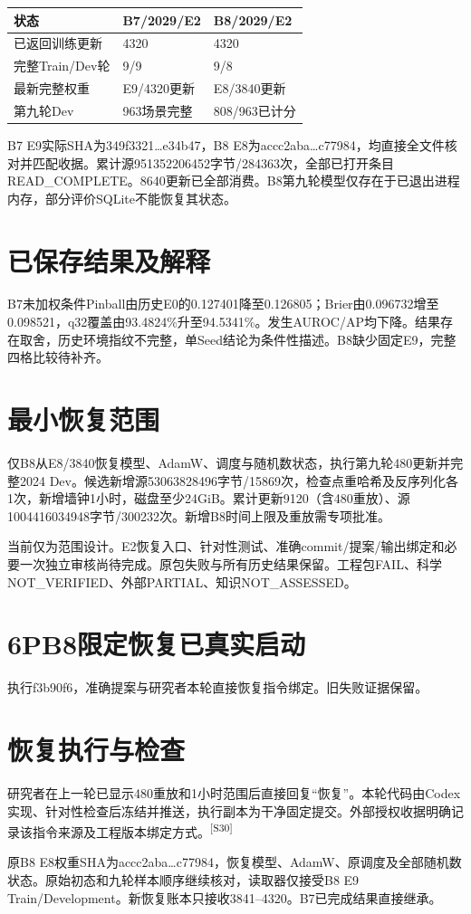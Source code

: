 \documentclass[UTF8,10.5pt,a4paper,fontset=none]{ctexart}
\newcommand{\evi}[1]{\textsuperscript{\color{muted}[#1]}}
\newcommand{\pageheading}[2]{\clearpage\section*{#1}\textcolor{muted}{#2}\par\vspace{3pt}}
\begin{document}
\begin{tabularx}{\textwidth}{@{}p{3.1cm}X X@{}}
\toprule 状态 & B7/2029/E2 & B8/2029/E2\\\midrule
已返回训练更新 & 4320 & 4320\\
完整Train/Dev轮 & 9/9 & 9/8\\
最新完整权重 & E9/4320更新 & E8/3840更新\\
第九轮Dev & 963场景完整 & 808/963已计分\\
\bottomrule
\end{tabularx}

B7 E9实际SHA为349f3321\ldots e34b47，B8 E8为accc2aba\ldots c77984，均直接全文件核对并匹配收据。累计源951352206452字节/284363次，全部已打开条目READ\_COMPLETE。8640更新已全部消费。B8第九轮模型仅存在于已退出进程内存，部分评价SQLite不能恢复其状态。

\section*{已保存结果及解释}
B7未加权条件Pinball由历史E0的0.127401降至0.126805；Brier由0.096732增至0.098521，q32覆盖由93.4824\%升至94.5341\%。发生AUROC/AP均下降。结果存在取舍，历史环境指纹不完整，单Seed结论为条件性描述。B8缺少固定E9，完整四格比较待补齐。

\section*{最小恢复范围}
仅B8从E8/3840恢复模型、AdamW、调度与随机数状态，执行第九轮480更新并完整2024 Dev。候选新增源53063828496字节/15869次，检查点重哈希及反序列化各1次，新增墙钟1小时，磁盘至少24GiB。累计更新9120（含480重放）、源1004416034948字节/300232次。新增B8时间上限及重放需专项批准。

当前仅为范围设计。E2恢复入口、针对性测试、准确commit/提案/输出绑定和必要一次独立审核尚待完成。原包失败与所有历史结果保留。工程包FAIL、科学NOT\_VERIFIED、外部PARTIAL、知识NOT\_ASSESSED。

\pageheading{6P\quad B8限定恢复已真实启动}{执行f3b90f6，准确提案与研究者本轮直接恢复指令绑定。旧失败证据保留。}
\section*{恢复执行与检查}
研究者在上一轮已显示480重放和1小时范围后直接回复“恢复”。本轮代码由Codex实现、针对性检查后冻结并推送，执行副本为干净固定提交。外部授权收据明确记录该指令来源及工程版本绑定方式。\evi{S30}

原B8 E8权重SHA为accc2aba\ldots c77984，恢复模型、AdamW、原调度及全部随机数状态。原始初态和九轮样本顺序继续核对，读取器仅接受B8 E9 Train/Development。新恢复账本只接收3841--4320。B7已完成结果直接继承。
\end{document}
